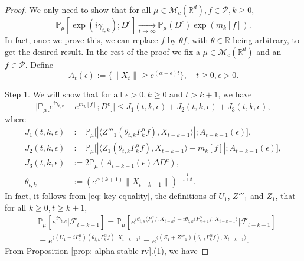 \documentclass[12pt,a4paper]{amsart}
\theoremstyle{plain}
\theoremstyle{definition}
\numberwithin{equation}{section}
\begin{document}
\begin{proof}
    We only need to show that for all $\mu \in \mathcal M_c(\mathbb R^d), f\in \mathcal P, k \geq 0$,
\begin{equation}
    \mathbb{P}_{\mu}[\exp(i\gamma_{t,k}); D^c]
    \xrightarrow[t\rightarrow \infty]{}\mathbb{P}_{\mu}(D^c)\exp(m_k[f]).
\end{equation}
    In fact, once we prove this, we can replace $f$ by $\theta f$, with $\theta \in \mathbb R$ being  arbitrary,  to get the desired result.
    In the rest of the proof we fix a $\mu \in \mathcal M_c(\mathbb R^d)$ and an $f\in \mathcal P$.
    Define
\[
    A_t(\epsilon)
    :=\{ \|X_t\| \geq e^{(\alpha - \epsilon)t} \},
    \quad t\geq 0, \epsilon > 0.
\]

    Step 1. We will show that for all $\epsilon > 0, k\geq 0$ and $t>k+1$, we have
\begin{equation}
    \big|\mathbb{P}_{\mu}\big[e^{i\gamma_{t,k}}-e^{m_k[f]}; D^c\big]\big|
    \leq J_1(t,k,\epsilon)+J_2(t,k,\epsilon)+J_3(t,k,\epsilon),
\end{equation}
    where
\begin{align}
\label{eq: Def of Ji}
    J_1(t,k,\epsilon)
    &:= \mathbb{P}_{\mu}\big[|\langle Z'''_1(\theta_{t,k}P^\alpha_k f), X_{t-k-1}\rangle|; A_{t-k-1}(\epsilon) \big],
    \\ J_2(t,k,\epsilon)
    &:= \mathbb{P}_{\mu}\big[|\langle Z_1(\theta_{t,k}P^\alpha_k f),X_{t-k-1}\rangle-m_k[f]|; A_{t-k-1}(\epsilon)\big],
    \\ J_3(t,k, \epsilon)
    &:=2\mathbb{P}_{\mu}(A_{t-k-1}(\epsilon)\Delta D^c),
    \\\theta_{t,k}
    &:= (e^{\alpha( k+1)}\|X_{t-k-1}\|)^{-\frac{1}{1+\beta}}.
\end{align}
    In fact, it follows from \eqref{eq: key equality}, the definitions of $U_1$, $Z'''_1$ and $Z_1$, that for all $k\geq 0, t\geq k+1$,
\begin{align}
\label{eq: need1}
    &\mathbb{P}_{\mu}[e^{i\gamma_{t,k}}|\mathscr{F}_{t-k-1}]
    =\mathbb{P}_{\mu}[e^{i\theta_{t,k}\langle P^\alpha_k f,X_{t-k}\rangle-i\theta_{t,k}\langle P^\alpha_{k+1} f, X_{t-k-1}\rangle}|\mathscr{F}_{t-k-1}]
    \\&=e^{\langle (U_1 - iP^\alpha_1 ) (\theta_{t,k}P^\alpha_k f),X_{t-k-1}\rangle}
    =e^{\langle (Z_1 + Z'''_1) (\theta_{t,k}P^\alpha_k f),X_{t-k-1}\rangle}.
\end{align}
    From Proposition \ref{prop: alpha stable rv}.(1), we have

\end{proof}
\end{document}

